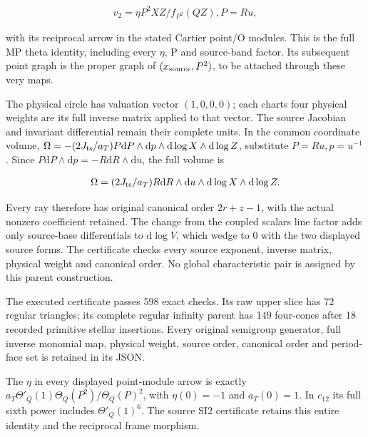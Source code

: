 \[
\begin{gathered}
v_{2}=\eta P^{2} XZ/f_{P^{2}}(QZ), P=Ru,
\end{gathered}
\]

with its reciprocal arrow in the stated Cartier point/O modules.
This is the full MP theta identity, including every \(\eta\), P and
source-band factor. Its subsequent point graph is the proper
graph of \((x_{\rm source},P^{2})\), to be attached through these very maps.

The physical circle has valuation vector \((1,0,0,0)\); each chart\textquotesingle s
four physical weights are its full inverse matrix applied to
that vector. The source Jacobian and invariant differential
remain their complete units. In the common coordinate volume,
\(\Omega=-(2J_{\rm ts}/a_T) P \mathrm dP\wedge \mathrm dp\wedge \mathrm d\log X\wedge \mathrm d\log Z\), substitute
\(P=Ru,p=u^{-1}\). Since \(P \mathrm dP\wedge \mathrm dp=-R \mathrm dR\wedge \mathrm du\), the full volume is

\[
\begin{gathered}
\Omega=(2J_{\rm ts}/a_T) R \mathrm dR\wedge \mathrm du\wedge \mathrm d\log X\wedge \mathrm d\log Z.
\end{gathered}
\]

Every ray therefore has original canonical order \(2r+z-1\), with
the actual nonzero coefficient retained. The change from the
coupled scalar\textquotesingle s line factor adds only source-base differentials
to \(\mathrm d\log V\), which wedge to 0 with the two displayed source forms.
The certificate checks every source exponent, inverse matrix,
physical weight and canonical order. No global characteristic
pair is assigned by this parent construction.

The executed certificate 
passes 598 exact checks. Its raw upper slice has 72 regular triangles;
its complete regular infinity parent has 149 four-cones after 18
recorded primitive stellar insertions. Every original semigroup
generator, full inverse monomial map, physical weight, source order,
canonical order and period-face set is retained in its JSON.

The \(\eta\) in every displayed point-module arrow is exactly
\(a_T \Theta'_Q(1) \Theta_Q(P^{2})/\Theta_Q(P)^{2}\), with \(\eta(0)=-1\)
and \(a_T(0)=1\). In \(c_{12}\) its full sixth power includes
\(\Theta'_Q(1)^{6}\). The source SI2 certificate retains this entire
identity and the reciprocal frame morphism.


